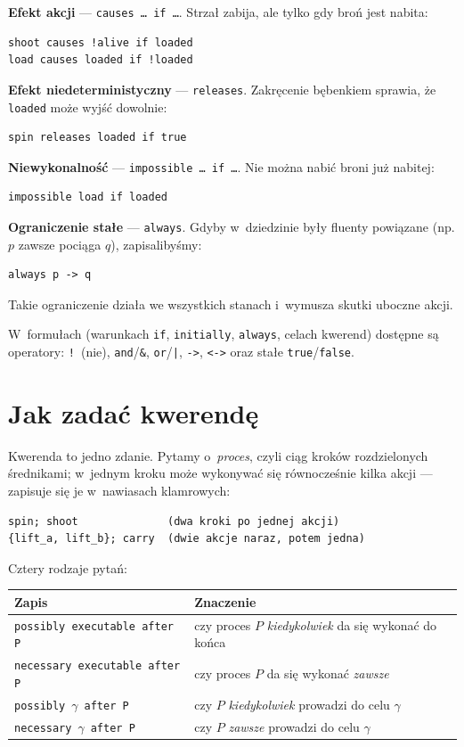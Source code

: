 \documentclass[11pt,a4paper]{article}
\begin{document}
\textbf{Efekt akcji} --- \texttt{causes \dots\ if \dots}. Strzał zabija,
ale tylko gdy broń jest nabita:
\begin{verbatim}
shoot causes !alive if loaded
load causes loaded if !loaded
\end{verbatim}

\textbf{Efekt niedeterministyczny} --- \texttt{releases}. Zakręcenie bębenkiem
sprawia, że \texttt{loaded} może wyjść dowolnie:
\begin{verbatim}
spin releases loaded if true
\end{verbatim}

\textbf{Niewykonalność} --- \texttt{impossible \dots\ if \dots}. Nie można
nabić broni już nabitej:
\begin{verbatim}
impossible load if loaded
\end{verbatim}

\textbf{Ograniczenie stałe} --- \texttt{always}. Gdyby w~dziedzinie były
fluenty powiązane (np. $p$ zawsze pociąga $q$), zapisalibyśmy:
\begin{verbatim}
always p -> q
\end{verbatim}
Takie ograniczenie działa we wszystkich stanach i~wymusza skutki uboczne
akcji.

W~formułach (warunkach \texttt{if}, \texttt{initially}, \texttt{always},
celach kwerend) dostępne są operatory: \texttt{!}~(nie),
\texttt{and}/\texttt{\&}, \texttt{or}/\texttt{|}, \texttt{->},
\texttt{<->} oraz stałe \texttt{true}/\texttt{false}.

\section{Jak zadać kwerendę}
\label{sec:kwerenda}

Kwerenda to jedno zdanie. Pytamy o~\emph{proces}, czyli ciąg kroków
rozdzielonych średnikami; w~jednym kroku może wykonywać się równocześnie
kilka akcji --- zapisuje się je w~nawiasach klamrowych:

\begin{verbatim}
spin; shoot              (dwa kroki po jednej akcji)
{lift_a, lift_b}; carry  (dwie akcje naraz, potem jedna)
\end{verbatim}

Cztery rodzaje pytań:

\begin{center}
\small
\begin{tabular}{@{}ll@{}}
\toprule
\textbf{Zapis} & \textbf{Znaczenie} \\
\midrule
\texttt{possibly executable after P}  & czy proces $P$ \emph{kiedykolwiek} da się wykonać do końca \\
\texttt{necessary executable after P} & czy proces $P$ da się wykonać \emph{zawsze} \\
\texttt{possibly}~$\gamma$~\texttt{after P}  & czy $P$ \emph{kiedykolwiek} prowadzi do celu $\gamma$ \\
\texttt{necessary}~$\gamma$~\texttt{after P} & czy $P$ \emph{zawsze} prowadzi do celu $\gamma$ \\
\bottomrule
\end{tabular}
\end{center}
\end{document}
